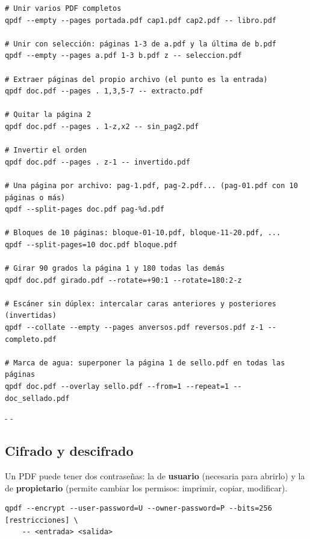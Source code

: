 \documentclass[11pt,a4paper]{article}
\makeatletter
\newcommand{\necesitaespacio}[1]{\par\penalty-100\begingroup
	\setlength{\dimen@}{#1}\dimen@ii\pagegoal\advance\dimen@ii-\pagetotal
	\ifdim\dimen@>\dimen@ii\ifdim\dimen@ii>\z@\vfil\fi\penalty-\@M\fi\endgroup}
\makeatother
\begin{document}
	\begin{lstlisting}
# Unir varios PDF completos
qpdf --empty --pages portada.pdf cap1.pdf cap2.pdf -- libro.pdf

# Unir con selección: páginas 1-3 de a.pdf y la última de b.pdf
qpdf --empty --pages a.pdf 1-3 b.pdf z -- seleccion.pdf

# Extraer páginas del propio archivo (el punto es la entrada)
qpdf doc.pdf --pages . 1,3,5-7 -- extracto.pdf

# Quitar la página 2
qpdf doc.pdf --pages . 1-z,x2 -- sin_pag2.pdf

# Invertir el orden
qpdf doc.pdf --pages . z-1 -- invertido.pdf

# Una página por archivo: pag-1.pdf, pag-2.pdf... (pag-01.pdf con 10 páginas o más)
qpdf --split-pages doc.pdf pag-%d.pdf

# Bloques de 10 páginas: bloque-01-10.pdf, bloque-11-20.pdf, ...
qpdf --split-pages=10 doc.pdf bloque.pdf

# Girar 90 grados la página 1 y 180 todas las demás
qpdf doc.pdf girado.pdf --rotate=+90:1 --rotate=180:2-z

# Escáner sin dúplex: intercalar caras anteriores y posteriores (invertidas)
qpdf --collate --empty --pages anversos.pdf reversos.pdf z-1 -- completo.pdf

# Marca de agua: superponer la página 1 de sello.pdf en todas las páginas
qpdf doc.pdf --overlay sello.pdf --from=1 --repeat=1 -- doc_sellado.pdf
\end{lstlisting}
	
	\necesitaespacio{8\baselineskip}
	\subsection{Cifrado y descifrado}\label{sec:qpdf-cifrado}
	
	Un PDF puede tener dos contraseñas: la de \textbf{usuario} (necesaria para abrirlo) y la de \textbf{propietario} (permite cambiar los permisos: imprimir, copiar, modificar).
	
	\begin{lstlisting}[style=sintaxis]
qpdf --encrypt --user-password=U --owner-password=P --bits=256 [restricciones] \
    -- <entrada> <salida>
\end{lstlisting}
	
\end{document}
